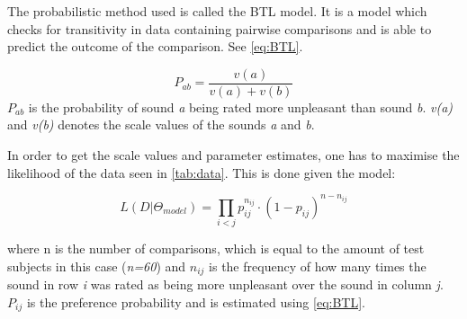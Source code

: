 The probabilistic method used is called the BTL model. It is a model which checks for transitivity in data containing pairwise comparisons and is able to predict the outcome of the comparison. See \autoref{eq:BTL}.

\begin{equation}
P_{ab} =\frac{v(a)}{v(a)+v(b)} 
\label{eq:BTL}
\end{equation}
%
$P_{ab}$ is the probability of sound \textit{a} being rated more unpleasant than sound \textit{b}. \textit{v(a)} and \textit{v(b)} denotes the scale values of the sounds \textit{a} and \textit{b}.
%




In order to get the scale values and parameter estimates, one has to maximise the likelihood of the data seen in \autoref{tab:data}. This is done given the model: 

\begin{equation}
L(D|\Theta_{model}) = \prod_{i<j} p_{ij} ^{n_{ij}}\cdot(1- p_{ij})^{n-n_{ij}}
\end{equation}

where n is the number of comparisons, which is equal to the amount of test subjects in this case (\textit{n=60}) and $n_{ij}$ is the frequency of how many times the sound in row \textit{i} was rated as being more unpleasant over the sound in column \textit{j}. $P_{ij}$ is the preference probability and is estimated using \autoref{eq:BTL}. 

